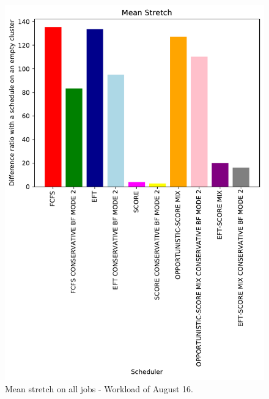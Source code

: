 \documentclass[conference,10pt]{IEEEtran}
\begin{document}
\begin{figure}\centering\includegraphics[width=1\linewidth]{../MBSS/plot/Results_FCFS_Score_Backfill_2022-08-16->2022-08-16_V10000_Mean_Stretch_450_128_32_256_4_1024.pdf}\caption{Mean stretch on all jobs - Workload of August 16.}\end{figure}
\end{document}

